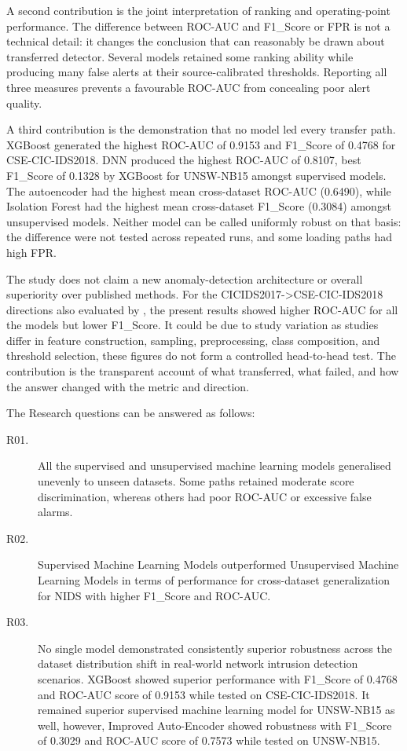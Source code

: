A second contribution is the joint interpretation of ranking and operating-point performance. The difference between ROC-AUC and F1\_Score or FPR 
is not a technical detail: it changes the conclusion that can reasonably be drawn about transferred detector. Several models retained some ranking 
ability while producing many false alerts at their source-calibrated thresholds. Reporting all three measures prevents a favourable ROC-AUC from 
concealing poor alert quality.

A third contribution is the demonstration that no model led every transfer path. XGBoost generated the highest ROC-AUC of 0.9153 and F1\_Score of 0.4768 
for CSE-CIC-IDS2018. DNN produced the highest ROC-AUC of 0.8107, best F1\_Score of 0.1328 by XGBoost for UNSW-NB15 amongst supervised models. The 
autoencoder had the highest mean cross-dataset ROC-AUC (0.6490), while Isolation Forest had the highest mean cross-dataset F1\_Score (0.3084) amongst unsupervised models. Neither model can be called uniformly robust on that 
basis: the difference were not tested across repeated runs, and some loading paths had high FPR.

The study does not claim a new anomaly-detection architecture or overall superiority over published methods. For the CICIDS2017->CSE-CIC-IDS2018 
directions also evaluated by \cite{Verkerken2022}, the present results showed higher ROC-AUC for all the models but lower F1\_Score. It could be 
due to study variation as studies differ in feature construction, sampling, preprocessing, class composition, and threshold selection, these figures 
do not form a controlled head-to-head test. The contribution is the transparent account of what transferred, what failed, and how the answer changed 
with the metric and direction.

The Research questions can be answered as follows:

\begin{description}
       \item[R01.]
       All the supervised and unsupervised machine learning models generalised unevenly to unseen datasets. Some paths retained moderate score discrimination, whereas others had poor ROC-AUC 
       or excessive false alarms. 
       
       \item[R02.]
       Supervised Machine Learning Models outperformed Unsupervised Machine Learning Models in terms of performance for cross-dataset 
       generalization for NIDS with higher F1\_Score and ROC-AUC. 
       
       \item[R03.]
        No single model demonstrated consistently superior robustness across the dataset distribution shift in real-world network intrusion detection scenarios. XGBoost showed superior performance with F1\_Score of 0.4768 and 
        ROC-AUC score of 0.9153 while tested on CSE-CIC-IDS2018. It remained superior supervised machine learning model for UNSW-NB15 as well, however, 
        Improved Auto-Encoder showed robustness with F1\_Score of 0.3029 and ROC-AUC score of 0.7573 while tested on UNSW-NB15.
\end{description}


